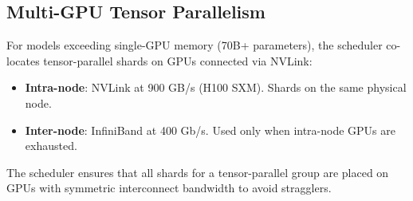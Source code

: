 \subsection{Multi-GPU Tensor Parallelism}

For models exceeding single-GPU memory (70B+ parameters), the scheduler
co-locates tensor-parallel shards on GPUs connected via NVLink:
\begin{itemize}[leftmargin=1.1em]
    \item \textbf{Intra-node}: NVLink at 900 GB/s (H100 SXM). Shards on the
    same physical node.
    \item \textbf{Inter-node}: InfiniBand at 400 Gb/s. Used only when intra-node
    GPUs are exhausted.
\end{itemize}

The scheduler ensures that all shards for a tensor-parallel group are placed on
GPUs with symmetric interconnect bandwidth to avoid stragglers.

